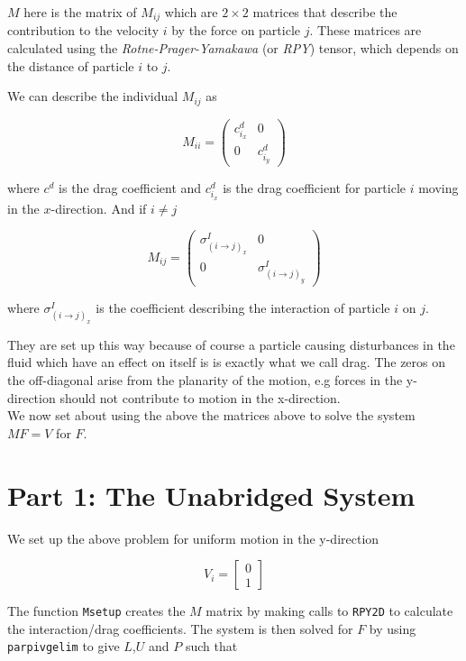 \documentclass[paper=a4, fontsize=12pt]{scrartcl} %
\numberwithin{equation}{section}       %
\numberwithin{figure}{section}         %
\numberwithin{table}{section}          %
\begin{document}
\noindent $M$ here is the matrix of $M_{ij}$ which are $2\times2$ matrices that describe the contribution to the velocity $i$ by the force on particle $j$. These matrices are calculated using the \textit{Rotne-Prager-Yamakawa} (or \textit{RPY}) tensor, which depends on the distance of particle $i$ to $j$. 

\noindent We can describe the individual $M_{ij}$ as 

$$ M_{ii} = 
\begin{pmatrix}
c^d_{i_{x}} & 0 \\
0 & c^d_{i_{y}}
\end{pmatrix}
$$

\noindent where $c^d$ is the drag coefficient and $c^d_{i_{x}}$ is the drag coefficient for particle $i$ moving in the $x$-direction. And if $i \neq j$ 

$$ M_{ij} = 
\begin{pmatrix}
 \sigma^I_{(i\rightarrow j)_{x}} & 0 \\
0 & \sigma^I_{(i\rightarrow j)_{y}}
\end{pmatrix}
$$

\noindent where $\sigma^I_{(i\rightarrow j)_{x}}$ is the coefficient describing the interaction of particle $i$ on $j$.  

\indent They are set up this way because of course a particle causing disturbances in the fluid which have an effect on itself is is exactly what we call drag. The zeros on the off-diagonal arise from the planarity of the motion, e.g forces in the y-direction should not contribute to motion in the x-direction. \\

\noindent We now set about using the above the matrices above to solve the system $MF = V$ for $F$. 


\section{Part 1: The Unabridged System}

We set up the above problem for uniform motion in the y-direction 

$$ V_i = 
\begin{bmatrix}
0 \\ 
1
\end{bmatrix} $$

\noindent The function \texttt{Msetup} creates the $M$ matrix by making calls to \texttt{RPY2D} to calculate the interaction/drag coefficients. 
The system is then solved for $F$ by using \texttt{parpivgelim} to give $L$,$U$ and $P$ such that 
\end{document}
